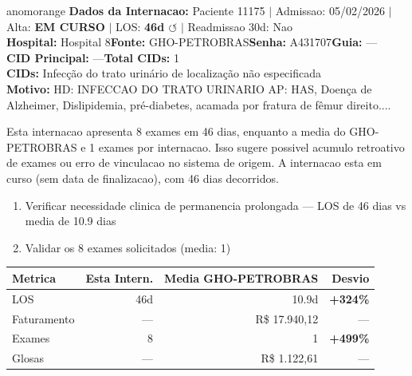 \documentclass[a4paper,10pt]{article}
\begin{document}
\begin{anomalycard}[Internacao 164560 | GHO-PETROBRAS | ALTO (z=4.51)]{anomorange}
\textbf{Dados da Internacao:} Paciente 11175 $\mid$ Admissao: 05/02/2026 $\mid$ Alta: \textcolor{anomorange}{\textbf{EM CURSO}} $\mid$ LOS: \textbf{46d \textcolor{anomorange}{$\circlearrowleft$}} $\mid$ Readmissao 30d: Nao\\
\textbf{Hospital:} Hospital 8\quad\textbf{Fonte:} GHO-PETROBRAS\quad\textbf{Senha:} A431707\quad\textbf{Guia:} ---\\
\textbf{CID Principal:} {\small ---}\quad\textbf{Total CIDs:} 1\\

\textbf{CIDs:} {\scriptsize Infecção do trato urinário de localização não especificada}\\

\textbf{Motivo:} {\scriptsize HD: INFECCAO DO TRATO URINARIO   AP: HAS, Doença de Alzheimer, Dislipidemia, pré-diabetes, acamada por fratura de fêmur direito....}\\

\vspace{2pt}\begin{tcolorbox}[colback=severityred!20,colframe=anomorange,title={\textbf{Interpretacao de Negocio}},fonttitle=\bfseries\small,left=4pt,right=4pt,top=3pt,bottom=3pt]
{\small Esta internacao apresenta 8 exames em 46 dias, enquanto a media do GHO-PETROBRAS e 1 exames por internacao. Isso sugere possivel acumulo retroativo de exames ou erro de vinculacao no sistema de origem. A internacao esta em curso (sem data de finalizacao), com 46 dias decorridos.}
\end{tcolorbox}
\begin{tcolorbox}[colback=severityyellow!30,colframe=anomorange,title={\textbf{Recomendacoes Especificas}},fonttitle=\bfseries\small,left=4pt,right=4pt,top=3pt,bottom=3pt]
\begin{enumerate}[nosep,leftmargin=16pt]
\item {\small Verificar necessidade clinica de permanencia prolongada --- LOS de 46 dias vs media de 10.9 dias}
\item {\small Validar os 8 exames solicitados (media: 1)}
\end{enumerate}
\end{tcolorbox}
\begin{center}\begin{tabular}{l r r r}\toprule\textbf{Metrica} & \textbf{Esta Intern.} & \textbf{Media GHO-PETROBRAS} & \textbf{Desvio} \\\midrule
LOS & 46d & 10.9d & \textcolor{anomred}{\textbf{+324\%}} \\
Faturamento & --- & R\$ 17.940,12 & --- \\
Exames & 8 & 1 & \textcolor{anomred}{\textbf{+499\%}} \\
Glosas & --- & R\$ 1.122,61 & --- \\
\bottomrule\end{tabular}\end{center}


\end{anomalycard}
\end{document}
